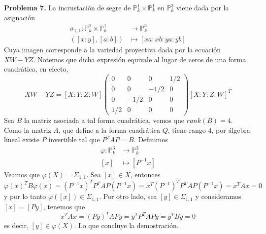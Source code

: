 \documentclass{article}
\def \P {\mathbb{P}}
\begin{document}
\vspace{5mm}
\noindent\textbf{Problema 7.} La incrustación de segre de $\P_{k}^{1}\times\P_{k}^{1}$ en 
$\P_{k}^{3}$ viene dada por la asignación
\begin{align*}
    \sigma_{1,1}:\P_{k}^{1}\times\P_{k}^{1} &\to \P_{k}^{3} \\
    ([x:y],[a:b]) &\mapsto [xa:xb:ya:yb]
\end{align*}
Cuya imagen corresponde a la variedad proyectiva dada por la ecuación $XW-YZ$. Notemos que dicha 
expresión equivale al lugar de ceros de una forma cuadrática, en efecto,
\begin{equation*}
    XW-YZ=[X:Y:Z:W]\begin{pmatrix}
        0 & 0 & 0 & 1/2 \\
        0 & 0 & -1/2 & 0 \\
        0 & -1/2 & 0 & 0 \\
        1/2 & 0 &  0 & 0
    \end{pmatrix}[X:Y:Z:W]^{T}
\end{equation*}
Sea $B$ la matriz asociada a tal forma cuadrática, vemos que $rank(B)=4$. Como la matriz $A$, que
define a la forma cuadrática $Q$, tiene rango $4$, por álgebra lineal existe $P$ invertible tal 
que $P^{T}AP=B$. Definimos
\begin{align*}
    \varphi:\P_{k}^{3} &\to \P_{k}^{3} \\
    [x] &\mapsto [P^{-1}x]
\end{align*}
Veamos que $\varphi(X)=\Sigma_{1,1}$. Sea $[x]\in X$, entonces
\begin{equation*}
    \varphi(x)^{T}B\varphi(x)=(P^{-1}x)^{T}P^{T}AP(P^{-1}x)=x^{T}(P^{-1})^{T}P^{T}AP(P^{-1}x)
    =x^{T}Ax=0
\end{equation*}
y por lo tanto $\varphi([x])\in\Sigma_{1,1}$. Por otro lado, sea $[y]\in\Sigma_{1,1}$ y 
consideramos $[x]=[Py]$, tenemos que
\begin{equation*}
    x^{T}Ax=(Py)^{T}APy=y^{T}P^{T}APy=y^{T}By=0
\end{equation*}
es decir, $[y]\in\varphi(X)$. Lo que concluye la demostración.

\end{document}
